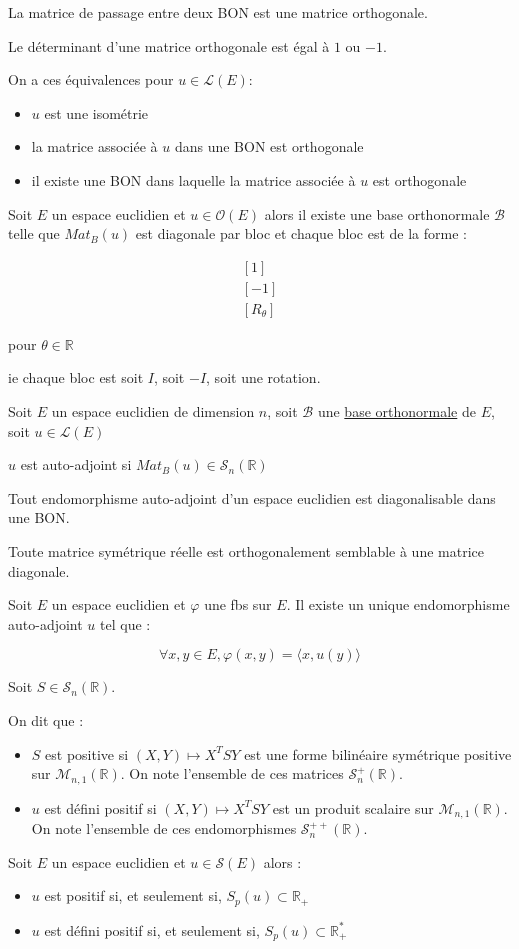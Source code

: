 \documentclass[a4paper,12pt]{book}
\newcommand{\Def}[2]{\begin{tcolorbox}[colback=white,colframe=red!10!green!20!blue!75!, title=Définition : #1]#2\end{tcolorbox}}
\newcommand{\Thr}[2]{\begin{tcolorbox}[sharp corners, colback=white,colframe=red!10!blue!30!green!75!, title=Théorème : #1]#2\end{tcolorbox}}
\def\R{\mathbb{R}}
\begin{document}
\Thr{}{La matrice de passage entre deux BON est une matrice orthogonale.
\par Le déterminant d'une matrice orthogonale est égal à $1$ ou $-1$.
\par On a ces équivalences pour $u\in\mathcal{L}(E)$:\begin{itemize}
\item $u$ est une isométrie
\item la matrice associée à $u$ dans une BON est orthogonale
\item il existe une BON dans laquelle la matrice associée à $u$ est orthogonale
\end{itemize}}
\Thr{}{Soit $E$ un espace euclidien et $u\in\mathcal{O}(E)$ alors il existe une base orthonormale $\mathcal{B}$ telle que $Mat_B(u)$ est diagonale par bloc et chaque bloc est de la forme :
\par $$\begin{matrix} [1] \\ [-1] \\ [R_\theta]\end{matrix}$$
\par pour $\theta\in\R$
\par ie chaque bloc est soit $I$, soit $-I$, soit une rotation.}
\Thr{}{Soit $E$ un espace euclidien de dimension $n$, soit $\mathcal{B}$ une \underline{base orthonormale} de $E$, soit $u\in\mathcal{L}(E)$
\par $u$ est auto-adjoint si $Mat_B(u)\in\mathcal{S}_n(\R)$}
\Thr{Théorème spectral}{Tout endomorphisme auto-adjoint d'un espace euclidien est diagonalisable dans une BON.}
\Thr{Théorème spectral matriciel}{Toute matrice symétrique réelle est orthogonalement semblable à une matrice diagonale.}
\Thr{}{Soit $E$ un espace euclidien et $\varphi$ une fbs sur $E$. Il existe un unique endomorphisme auto-adjoint $u$ tel que :
\par $$\forall x,y\in E, \varphi(x,y) = \langle x, u(y)\rangle$$}
\Def{}{Soit $S\in\mathcal{S}_n(\R)$.
\par On dit que :\begin{itemize}
\item $S$ est positive si $(X,Y)\mapsto X^T SY$ est une forme bilinéaire symétrique positive sur $\mathcal{M}_{n,1}(\R)$. On note l'ensemble de ces matrices $\mathcal{S}_n^+(\R)$.
\item $u$ est défini positif si $(X,Y)\mapsto X^TSY$ est un produit scalaire sur $\mathcal{M}_{n,1}(\R)$. On note l'ensemble de ces endomorphismes $\mathcal{S}_n^{++}(\R)$.
\end{itemize}}
\Thr{}{Soit $E$ un espace euclidien et $u\in\mathcal{S}(E)$ alors :\begin{itemize}
\item $u$ est positif si, et seulement si, $S_p(u)\subset\R_+$
\item $u$ est défini positif si, et seulement si, $S_p(u)\subset\R_+^*$
\end{itemize}}
\end{document}
